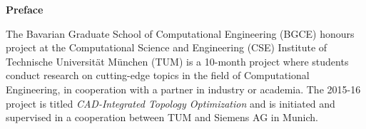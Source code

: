 \clearemptydoublepage
{}
{}	


\vspace*{3cm}

\begin{flushleft}
{\Large \bf Preface}
\end{flushleft}

\vspace{1cm}
The Bavarian Graduate School of Computational Engineering (BGCE) honours project at the Computational Science and Engineering (CSE) Institute of Technische Universit{\"a}t M{\"u}nchen (TUM) is a 10-month project where students conduct research on cutting-edge topics in the field of Computational Engineering, in cooperation with a partner in industry or academia. The 2015-16 project is titled \emph{CAD-Integrated Topology Optimization} and is initiated and supervised in a cooperation between TUM and Siemens AG in Munich.


\newpage
